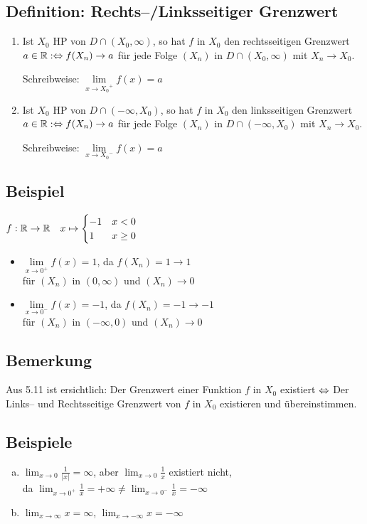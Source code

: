 \documentclass[10pt, a4paper, fleqn]{article}
\begin{document}
\subsection{Definition: Rechts--/Linksseitiger Grenzwert}
\begin{enumerate}[1.]
    \item Ist $X_0$ HP von $D \cap (X_0, \infty)$, so hat $f$ in $X_0$ den rechtsseitigen Grenzwert
    $a \in \mathbb{R} :\Leftrightarrow f(X_n) \to a$ für jede Folge $(X_n)$ in $D \cap (X_0, \infty)$ mit $X_n \to X_0$.

    Schreibweise: $\lim\limits_{x \to {X_0}^+} f(x) = a$

    \item Ist $X_0$ HP von $D \cap (-\infty, X_0)$, so hat $f$ in $X_0$ den linksseitigen Grenzwert
    $a \in \mathbb{R} :\Leftrightarrow f(X_n) \to a$ für jede Folge $(X_n)$ in $D \cap (-\infty, X_0)$ mit $X_n \to X_0$.

    Schreibweise: $\lim\limits_{x \to {X_0}^-} f(x) = a$
\end{enumerate}

\subsection{Beispiel}
$f: \mathbb{R} \to \mathbb{R} \quad x \mapsto \begin{cases}
    -1 & x < 0 \\
    1 & x \geq 0
\end{cases}$

\begin{itemize}
    \item $\lim\limits_{x \to 0^+} f(x) = 1$, da $f(X_n) = 1 \to 1$ \\
    für $(X_n)$ in $(0, \infty)$ und $(X_n) \to 0$

    \item $\lim\limits_{x \to 0^-} f(x) = -1$, da $f(X_n) = -1 \to -1$ \\
    für $(X_n)$ in $(-\infty, 0)$ und $(X_n) \to 0$
\end{itemize}

\subsection{Bemerkung}
Aus 5.11 ist ersichtlich: Der Grenzwert einer Funktion $f$ in $X_0$ existiert $\Leftrightarrow$ Der Links--
und Rechtsseitige Grenzwert von $f$ in $X_0$ existieren und übereinstimmen.

\subsection{Beispiele}
\begin{enumerate}[a)]
    \item $\lim_{x \to 0} \frac{1}{|x|} = \infty$, aber $\lim_{x \to 0} \frac{1}{x}$ existiert nicht, \\
    da $\lim_{x \to 0^+} \frac{1}{x} = +\infty \neq \lim_{x \to 0^-} \frac{1}{x} = - \infty$

    \item $\lim_{x \to \infty} x = \infty$, $\lim_{x \to -\infty} x = -\infty$
\end{enumerate}
\end{document}

